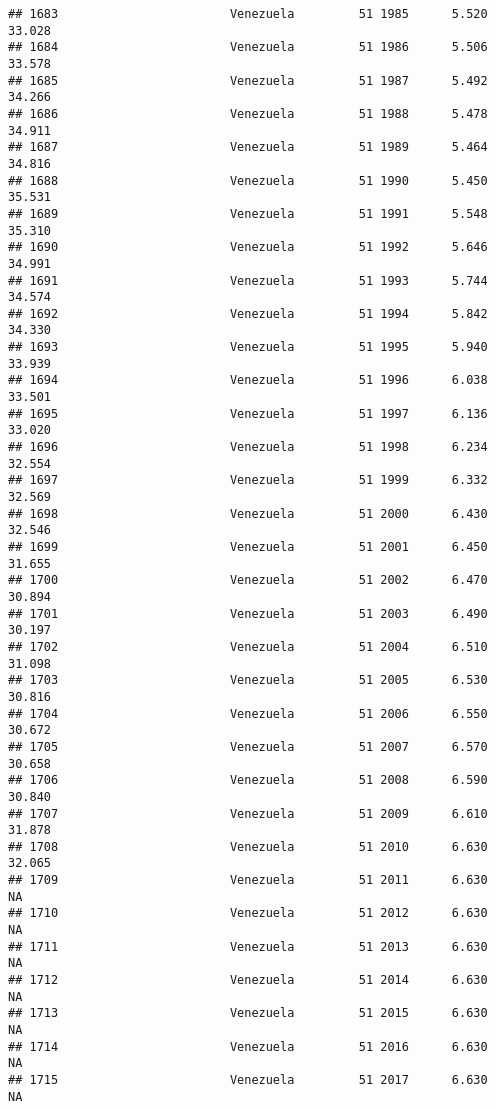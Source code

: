 \documentclass[
]{article}
\begin{document}
\begin{verbatim}
## 1683                        Venezuela         51 1985      5.520     33.028
## 1684                        Venezuela         51 1986      5.506     33.578
## 1685                        Venezuela         51 1987      5.492     34.266
## 1686                        Venezuela         51 1988      5.478     34.911
## 1687                        Venezuela         51 1989      5.464     34.816
## 1688                        Venezuela         51 1990      5.450     35.531
## 1689                        Venezuela         51 1991      5.548     35.310
## 1690                        Venezuela         51 1992      5.646     34.991
## 1691                        Venezuela         51 1993      5.744     34.574
## 1692                        Venezuela         51 1994      5.842     34.330
## 1693                        Venezuela         51 1995      5.940     33.939
## 1694                        Venezuela         51 1996      6.038     33.501
## 1695                        Venezuela         51 1997      6.136     33.020
## 1696                        Venezuela         51 1998      6.234     32.554
## 1697                        Venezuela         51 1999      6.332     32.569
## 1698                        Venezuela         51 2000      6.430     32.546
## 1699                        Venezuela         51 2001      6.450     31.655
## 1700                        Venezuela         51 2002      6.470     30.894
## 1701                        Venezuela         51 2003      6.490     30.197
## 1702                        Venezuela         51 2004      6.510     31.098
## 1703                        Venezuela         51 2005      6.530     30.816
## 1704                        Venezuela         51 2006      6.550     30.672
## 1705                        Venezuela         51 2007      6.570     30.658
## 1706                        Venezuela         51 2008      6.590     30.840
## 1707                        Venezuela         51 2009      6.610     31.878
## 1708                        Venezuela         51 2010      6.630     32.065
## 1709                        Venezuela         51 2011      6.630         NA
## 1710                        Venezuela         51 2012      6.630         NA
## 1711                        Venezuela         51 2013      6.630         NA
## 1712                        Venezuela         51 2014      6.630         NA
## 1713                        Venezuela         51 2015      6.630         NA
## 1714                        Venezuela         51 2016      6.630         NA
## 1715                        Venezuela         51 2017      6.630         NA

\end{verbatim}
\end{document}
